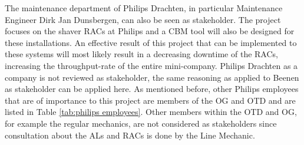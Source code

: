 The maintenance department of Philips Drachten, in particular Maintenance Engineer Dirk Jan Dunsbergen, can also be seen as stakeholder. The project focuses on the shaver RACs at Philips and a CBM tool will also be designed for these installations. An effective result of this project that can be implemented to these systems will most likely result in a decreasing downtime of the RACs, increasing the throughput-rate of the entire mini-company. Philips Drachten as a company is not reviewed as stakeholder, the same reasoning as applied to Beenen as stakeholder can be applied here. As mentioned before, other Philips employees that are of importance to this project are members of the OG and OTD and are listed in Table \ref{tab:philips employees}. Other members within the OTD and OG, for example the regular mechanics, are not considered as stakeholders since consultation about the ALs and RACs is done by the Line Mechanic.
